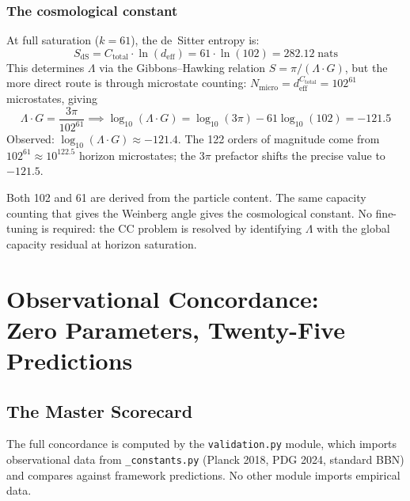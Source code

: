 \documentclass[11pt]{article}
\newcommand{\nats}{\;\mathrm{nats}}
\begin{document}
\subsubsection{The cosmological constant}

At full saturation ($k=61$), the de~Sitter entropy is:
\begin{equation}
S_{\mathrm{dS}} = C_{\mathrm{total}} \cdot \ln(d_{\mathrm{eff}}) = 61 \cdot \ln(102) = 282.12\nats
\end{equation}
This determines $\Lambda$ via the Gibbons--Hawking relation $S = \pi/(\Lambda\cdot G)$, but the more direct route is through microstate counting: $N_{\mathrm{micro}} = d_{\mathrm{eff}}^{C_{\mathrm{total}}} = 102^{61}$ microstates, giving
\begin{equation}
\Lambda \cdot G = \frac{3\pi}{102^{61}} \implies \log_{10}(\Lambda \cdot G) = \log_{10}(3\pi) - 61\log_{10}(102) = -121.5
\end{equation}
Observed: $\log_{10}(\Lambda\cdot G) \approx -121.4$.  The 122 orders of magnitude come from $102^{61} \approx 10^{122.5}$ horizon microstates; the $3\pi$ prefactor shifts the precise value to $-121.5$.

Both 102 and 61 are derived from the particle content.  The same capacity counting that gives the Weinberg angle gives the cosmological constant.  No fine-tuning is required: the CC problem is resolved by identifying $\Lambda$ with the global capacity residual at horizon saturation.


\section{Observational Concordance:\\ Zero Parameters, Twenty-Five Predictions}

\subsection{The Master Scorecard}

The full concordance is computed by the \texttt{validation.py} module, which imports observational data from \texttt{\_constants.py} (Planck 2018, PDG 2024, standard BBN) and compares against framework predictions.  No other module imports empirical data.
\end{document}
